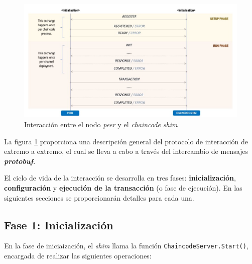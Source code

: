 \begin{figure}[tbph]
\centering
\includegraphics[width=\textwidth]{Images/interaction_protocol}
\caption{Interacción entre el nodo \textit{peer} y el \textit{chaincode shim}}
\label{fig:interactionprotocol}
\end{figure}

La figura \ref{fig:interactionprotocol} proporciona una descripción general del protocolo de interacción de extremo a extremo, el cual se lleva a cabo a través del intercambio de mensajes \textit{\textbf{protobuf}}.

El ciclo de vida de la interacción se desarrolla en tres fases: \textbf{inicialización}, \textbf{configuración} y \textbf{ejecución de la transacción} (o fase de ejecución). En las siguientes secciones se proporcionarán detalles para cada una.

\subsection{Fase 1: Inicialización}
%
%
%
%

En la fase de iniciaización, el \textit{shim} llama la función  \texttt{ChaincodeServer.Start()}, encargada de realizar las siguientes operaciones:

